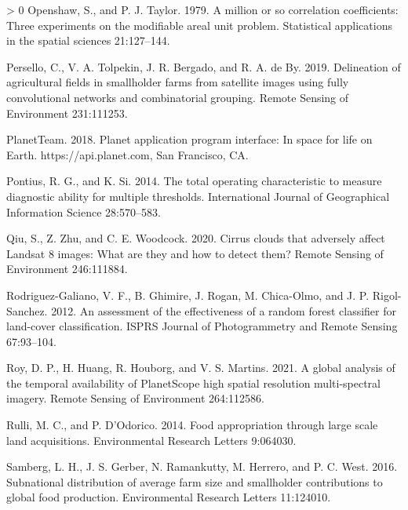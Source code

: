\documentclass[11pt,a4paper]{article}
\newlength{\cslhangindent}
\newenvironment{CSLReferences}[3] %
 {%
  \setlength{\parindent}{0pt}
  \ifodd #1 \everypar{\setlength{\hangindent}{\cslhangindent}}\ignorespaces\fi
  \ifnum #2 > 0
  \setlength{\parskip}{#2\baselineskip}
  \fi
 }%
 {}
\begin{document}
\begin{CSLReferences}{1}{0}
\leavevmode\hypertarget{ref-Openshawmillioncorrelationcoefficients1979}{}%
Openshaw, S., and P. J. Taylor. 1979. A million or so correlation
coefficients: Three experiments on the modifiable areal unit problem.
Statistical applications in the spatial sciences 21:127--144.

\leavevmode\hypertarget{ref-perselloDelineationAgriculturalFields2019}{}%
Persello, C., V. A. Tolpekin, J. R. Bergado, and R. A. de By. 2019.
Delineation of agricultural fields in smallholder farms from satellite
images using fully convolutional networks and combinatorial grouping.
Remote Sensing of Environment 231:111253.

\leavevmode\hypertarget{ref-planetteamPlanetApplicationProgram2018}{}%
PlanetTeam. 2018. Planet application program interface: In space for
life on {Earth}. {https://api.planet.com}, {San Francisco, CA}.

\leavevmode\hypertarget{ref-Pontiustotaloperatingcharacteristic2014}{}%
Pontius, R. G., and K. Si. 2014. The total operating characteristic to
measure diagnostic ability for multiple thresholds. International
Journal of Geographical Information Science 28:570--583.

\leavevmode\hypertarget{ref-qiuCirrusCloudsThat2020}{}%
Qiu, S., Z. Zhu, and C. E. Woodcock. 2020. Cirrus clouds that adversely
affect {Landsat} 8 images: {What} are they and how to detect them?
Remote Sensing of Environment 246:111884.

\leavevmode\hypertarget{ref-rodriguez-galianoAssessmentEffectivenessRandom2012}{}%
Rodriguez-Galiano, V. F., B. Ghimire, J. Rogan, M. Chica-Olmo, and J. P.
Rigol-Sanchez. 2012. An assessment of the effectiveness of a random
forest classifier for land-cover classification. ISPRS Journal of
Photogrammetry and Remote Sensing 67:93--104.

\leavevmode\hypertarget{ref-royGlobalAnalysisTemporal2021}{}%
Roy, D. P., H. Huang, R. Houborg, and V. S. Martins. 2021. A global
analysis of the temporal availability of {PlanetScope} high spatial
resolution multi-spectral imagery. Remote Sensing of Environment
264:112586.

\leavevmode\hypertarget{ref-RulliFoodappropriationlarge2014}{}%
Rulli, M. C., and P. D'Odorico. 2014. Food appropriation through large
scale land acquisitions. Environmental Research Letters 9:064030.

\leavevmode\hypertarget{ref-SambergSubnationaldistributionaverage2016}{}%
Samberg, L. H., J. S. Gerber, N. Ramankutty, M. Herrero, and P. C. West.
2016. Subnational distribution of average farm size and smallholder
contributions to global food production. Environmental Research Letters
11:124010.


\end{CSLReferences}
\end{document}

